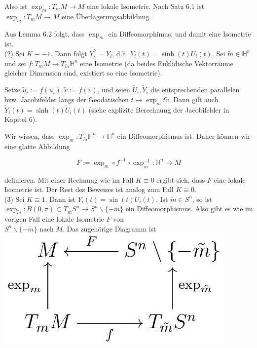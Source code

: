 \documentclass[10pt]{article}
\begin{document}
Also ist $\exp _{m}: T_{m} M \rightarrow M$ eine lokale Isometrie. Nach Satz 6.1 ist $\exp _{m}: T_{m} M \rightarrow M$ eine Überlagerungsabbildung.

Aus Lemma 6.2 folgt, dass $\exp _{m}$ ein Diffeomorphimus, und damit eine Isometrie ist.\\
(2) Sei $K \equiv-1$. Dann folgt $Y_{i}^{\prime \prime}=Y_{i}$, d.h. $Y_{i}(t)=\sinh (t) U_{i}(t)$. Sei $\tilde{m} \in \mathbb{H}^{n}$ und sei $f: T_{m} M \rightarrow T_{\tilde{m}} \mathbb{H}^{n}$ eine Isometrie (da beides Euklidische Vektorräume gleicher Dimension sind, existiert so eine Isometrie).

Setze $\tilde{u}_{i}:=f\left(u_{i}\right), \tilde{v}:=f(v)$, und seien $\tilde{U}_{i}, \tilde{Y}_{i}$ die entsprechenden parallelen bzw. Jacobifelder längs der Geodätischen $t \mapsto \exp _{\tilde{m}} t \tilde{v}$. Dann gilt auch $\tilde{Y}_{i}(t)=\sinh (t) \tilde{U}_{i}(t)$ (siehe explizite Berechnung der Jacobifelder in Kapitel 6).

Wir wissen, dass $\exp _{\tilde{m}}: T_{\tilde{m}} \mathbb{H}^{n} \rightarrow \mathbb{H}^{n}$ ein Diffeomorphismus ist. Daher können wir eine glatte Abbildung

$$
F:=\exp _{m} \circ f^{-1} \circ \exp _{\tilde{m}}^{-1}: \mathbb{H}^{n} \rightarrow M
$$

definieren. Mit einer Rechnung wie im Fall $K \equiv 0$ ergibt sich, dass $F$ eine lokale Isometrie ist. Der Rest des Beweises ist analog zum Fall $K \equiv 0$.\\
(3) Sei $K \equiv 1$. Dann ist $Y_{i}(t)=\sin (t) U_{i}(t)$. Ist $\tilde{m} \in S^{n}$, so ist $\exp _{\tilde{m}}: B(0, \pi) \subset T_{\tilde{m}} S^{n} \rightarrow S^{n} \backslash\{-\tilde{m}\}$ ein Diffeomorphismus. Also gibt es wie im vorigen Fall eine lokale Isometrie $F$ von\\
$S^{n} \backslash\{-\tilde{m}\}$ nach $M$. Das zugehörige Diagramm ist\\
\includegraphics[max width=\textwidth, center]{2025_05_20_3825c151ba0898b77b6eg-086}
\end{document}
